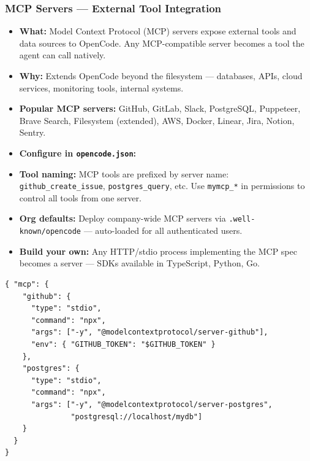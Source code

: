 \begin{frame}[fragile]\frametitle{MCP Servers — External Tool Integration}
  \begin{itemize}
    \item \textbf{What:} Model Context Protocol (MCP) servers expose external tools and data sources to OpenCode. Any MCP-compatible server becomes a tool the agent can call natively.
    \item \textbf{Why:} Extends OpenCode beyond the filesystem — databases, APIs, cloud services, monitoring tools, internal systems.
    \item \textbf{Popular MCP servers:} GitHub, GitLab, Slack, PostgreSQL, Puppeteer, Brave Search, Filesystem (extended), AWS, Docker, Linear, Jira, Notion, Sentry.
    \item \textbf{Configure in \texttt{opencode.json}:}
    \item \textbf{Tool naming:} MCP tools are prefixed by server name: \texttt{github\_create\_issue}, \texttt{postgres\_query}, etc. Use \texttt{mymcp\_*} in permissions to control all tools from one server.
    \item \textbf{Org defaults:} Deploy company-wide MCP servers via \texttt{.well-known/opencode} — auto-loaded for all authenticated users.
    \item \textbf{Build your own:} Any HTTP/stdio process implementing the MCP spec becomes a server — SDKs available in TypeScript, Python, Go.
  \end{itemize}
  
\begin{lstlisting}
{ "mcp": {
    "github": {
      "type": "stdio",
      "command": "npx",
      "args": ["-y", "@modelcontextprotocol/server-github"],
      "env": { "GITHUB_TOKEN": "$GITHUB_TOKEN" }
    },
    "postgres": {
      "type": "stdio",
      "command": "npx",
      "args": ["-y", "@modelcontextprotocol/server-postgres",
               "postgresql://localhost/mydb"]
    }
  }
}
\end{lstlisting}  
\end{frame}


